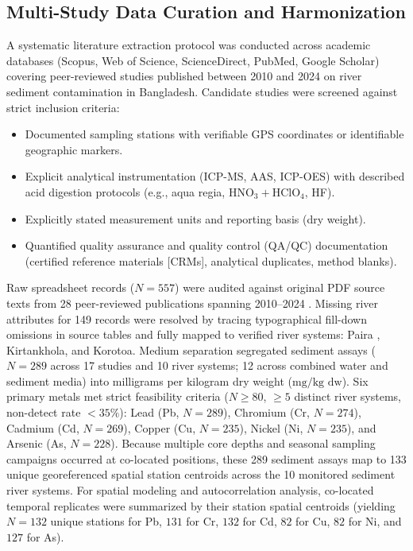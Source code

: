 \documentclass[authoryear,preprint,12pt]{elsarticle}
\begin{document}
\subsection{Multi-Study Data Curation and Harmonization}
A systematic literature extraction protocol was conducted across academic databases (Scopus, Web of Science, ScienceDirect, PubMed, Google Scholar) covering peer-reviewed studies published between 2010 and 2024 on river sediment contamination in Bangladesh. Candidate studies were screened against strict inclusion criteria:
\begin{itemize}
    \item Documented sampling stations with verifiable GPS coordinates or identifiable geographic markers.
    \item Explicit analytical instrumentation (ICP-MS, AAS, ICP-OES) with described acid digestion protocols (e.g., aqua regia, $\text{HNO}_3+\text{HClO}_4$, HF).
    \item Explicitly stated measurement units and reporting basis (dry weight).
    \item Quantified quality assurance and quality control (QA/QC) documentation (certified reference materials [CRMs], analytical duplicates, method blanks).
\end{itemize}

Raw spreadsheet records ($N=557$) were audited against original PDF source texts from 28 peer-reviewed publications spanning 2010--2024 \citep{Ahmad2010,Bhuiyan2015,Islam2015,Ali2016,Islam2017,Islam2018,Ali2021,Acharjee2022}. Missing river attributes for 149 records were resolved by tracing typographical fill-down omissions in source tables and fully mapped to verified river systems: Paira \citep{Islam2017}, Kirtankhola, and Korotoa. Medium separation segregated sediment assays ($N=289$ across 17 studies and 10 river systems; 12 across combined water and sediment media) into milligrams per kilogram dry weight ($\text{mg/kg dw}$). Six primary metals met strict feasibility criteria ($N \ge 80$, $\ge 5$ distinct river systems, non-detect rate $< 35\%$): Lead (Pb, $N=289$), Chromium (Cr, $N=274$), Cadmium (Cd, $N=269$), Copper (Cu, $N=235$), Nickel (Ni, $N=235$), and Arsenic (As, $N=228$). Because multiple core depths and seasonal sampling campaigns occurred at co-located positions, these 289 sediment assays map to 133 unique georeferenced spatial station centroids across the 10 monitored sediment river systems. For spatial modeling and autocorrelation analysis, co-located temporal replicates were summarized by their station spatial centroids (yielding $N=132$ unique stations for Pb, $131$ for Cr, $132$ for Cd, $82$ for Cu, $82$ for Ni, and $127$ for As).
\end{document}
